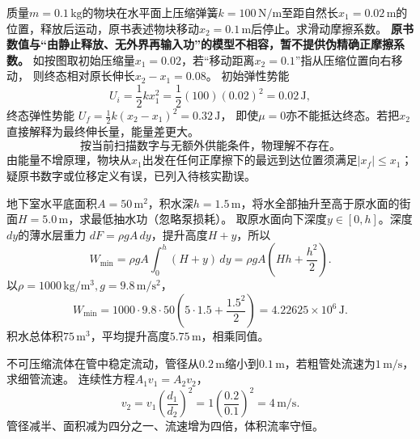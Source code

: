 \problemtext 质量$m=0.1\,\mathrm{kg}$的物块在水平面上压缩弹簧$k=100\,\mathrm{N/m}$至距自然长$x_1=0.02\,\mathrm m$的位置，释放后运动，原书表述物块移动$x_2=0.1\,\mathrm m$后停止。求滑动摩擦系数。
\workings
\textbf{原书数值与“由静止释放、无外界再输入功”的模型不相容，暂不提供伪精确正摩擦系数。}
如按图取初始压缩量$x_1=0.02$，若“移动距离$x_2=0.1$”指从压缩位置向右移动，
则终态相对原长伸长$x_2-x_1=0.08$。
初始弹性势能
\[
U_i=\frac12kx_1^2=\frac12(100)(0.02)^2=0.02\,\mathrm J,
\]
终态弹性势能
$U_f=\frac12k(x_2-x_1)^2=0.32\,\mathrm J$，
即使$\mu=0$亦不能抵达终态。若把$x_2$直接解释为最终伸长量，能量差更大。
\[
\boxed{\text{按当前扫描数字与无额外供能条件，物理解不存在。}}
\]
\crosscheck 由能量不增原理，物块从$x_1$出发在任何正摩擦下的最远到达位置须满足$|x_f|\le x_1$；疑原书数字或位移定义有误，已列入待核实勘误。

\problemtext 地下室水平底面积$A=50\,\mathrm{m^2}$，积水深$h=1.5\,\mathrm m$，将水全部抽升至高于原水面的街面$H=5.0\,\mathrm m$，求最低抽水功（忽略泵损耗）。
\workings
取原水面向下深度$y\in[0,h]$。深度$dy$的薄水层重力
$dF=\rho gA\,dy$，提升高度$H+y$，所以
\[
W_{\min}=\rho gA\int_0^h(H+y)\,dy
=\rho gA\left(Hh+\frac{h^2}{2}\right).
\]
以$\rho=1000\,\mathrm{kg/m^3},g=9.8\,\mathrm{m/s^2}$，
\[
\boxed{W_{\min}
=1000\cdot9.8\cdot50\left(5\cdot1.5+\frac{1.5^2}{2}\right)
=4.22625\times10^6\,\mathrm J}.
\]
\crosscheck 积水总体积$75\,\mathrm{m^3}$，平均提升高度$5.75\,\mathrm m$，相乘同值。

\problemtext 不可压缩流体在管中稳定流动，管径从$0.2\,\mathrm m$缩小到$0.1\,\mathrm m$，若粗管处流速为$1\,\mathrm{m/s}$，求细管流速。
\workings
连续性方程$A_1v_1=A_2v_2$，
\[
\boxed{v_2=v_1\left(\frac{d_1}{d_2}\right)^2
=1\left(\frac{0.2}{0.1}\right)^2
=4\,\mathrm{m/s}}.
\]
\crosscheck 管径减半、面积减为四分之一、流速增为四倍，体积流率守恒。
